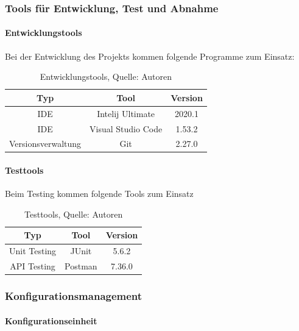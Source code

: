 \subsubsection{Tools f\"ur Entwicklung, Test und Abnahme}
\paragraph{Entwicklungstools}
Bei der Entwicklung des Projekts kommen folgende Programme zum Einsatz: 

\begin{table}[H]
\setlength\extrarowheight{2pt} %
\begin{tabularx}{\textwidth}{|C|C|C|}
\hline
\textbf{Typ} &\textbf{Tool} & \textbf{Version}  \\

\hline
IDE & Intelij Ultimate  & 2020.1\\
\hline
IDE & Visual Studio Code & 1.53.2\\ 
\hline
Versionsverwaltung & Git & 2.27.0\\
\hline
\end{tabularx}
\caption{ \label{tbl: Entwicklungstools}Entwicklungstools, Quelle: Autoren}
\end{table}
\paragraph{Testtools}
Beim Testing kommen folgende Tools zum Einsatz

\begin{table}[H]
\setlength\extrarowheight{2pt} %
\begin{tabularx}{\textwidth}{|C|C|C|}
\hline
\textbf{Typ} &\textbf{Tool} & \textbf{Version}  \\
\hline
Unit Testing & JUnit  & 5.6.2\\
\hline 
API Testing & Postman & 7.36.0\\
\hline
\end{tabularx}
\caption{ \label{tbl: Testtools}Testtools, Quelle: Autoren}
\end{table}
\subsubsection{Konfigurationsmanagement}
\paragraph{Konfigurationseinheit}

